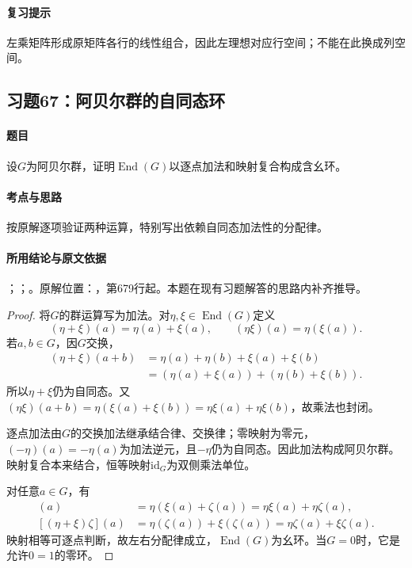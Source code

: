 \paragraph{复习提示}

左乘矩阵形成原矩阵各行的线性组合，因此左理想对应行空间；不能在此换成列空间。



\subsection{习题67：阿贝尔群的自同态环}

\label{ex:3:67}

\paragraph{题目}

设$G$为阿贝尔群，证明$\operatorname{End}(G)$以逐点加法和映射复合构成含幺环。

\paragraph{考点与思路}

按原解逐项验证两种运算，特别写出依赖自同态加法性的分配律。

\paragraph{所用结论与原文依据}

；；。原解位置：，第679行起。本题在现有习题解答的思路内补齐推导。


\begin{proof}

将$G$的群运算写为加法。对$\eta,\xi\in\operatorname{End}(G)$定义
\[
(\eta+\xi)(a)=\eta(a)+\xi(a),\qquad
(\eta\xi)(a)=\eta(\xi(a)).
\]
若$a,b\in G$，因$G$交换，
\begin{align*}
(\eta+\xi)(a+b)
&=\eta(a)+\eta(b)+\xi(a)+\xi(b)\\
&=(\eta(a)+\xi(a))+(\eta(b)+\xi(b)).
\end{align*}
所以$\eta+\xi$仍为自同态。又$(\eta\xi)(a+b)=\eta(\xi(a)+\xi(b))=\eta\xi(a)+\eta\xi(b)$，故乘法也封闭。

逐点加法由$G$的交换加法继承结合律、交换律；零映射为零元，$(-\eta)(a)=-\eta(a)$为加法逆元，且$-\eta$仍为自同态。因此加法构成阿贝尔群。映射复合本来结合，恒等映射$\mathrm{id}_G$为双侧乘法单位。

对任意$a\in G$，有
\begin{align*}
[\eta(\xi+\zeta)](a)
&=\eta(\xi(a)+\zeta(a))=\eta\xi(a)+\eta\zeta(a),\\
[(\eta+\xi)\zeta](a)
&=\eta(\zeta(a))+\xi(\zeta(a))=\eta\zeta(a)+\xi\zeta(a).
\end{align*}
映射相等可逐点判断，故左右分配律成立，$\operatorname{End}(G)$为幺环。当$G=0$时，它是允许$0=1$的零环。

\end{proof}

